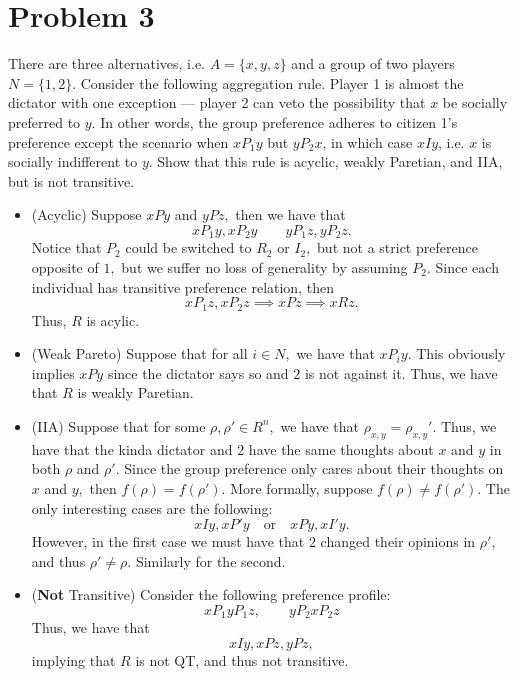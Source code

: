 \documentclass[11pt]{article}
\begin{document}
\newpage
\section*{Problem 3}
There are three alternatives, i.e. $A = \{x, y, z\}$ and a group of two players $N =\{1, 2\}.$ Consider the following aggregation rule. Player 1 is almost the dictator with one
exception — player 2 can veto the possibility that $x$ be socially preferred to $y$. In other
words, the group preference adheres to citizen 1’s preference except the scenario when $xP_1y$
but $yP_2x$, in which case $xIy$, i.e. $x$ is socially indifferent to $y$. Show that this rule is acyclic, weakly Paretian, and IIA, but is not transitive.
\begin{solution}
\begin{itemize}
    \item (Acyclic)
    Suppose $xPy$ and $yPz,$ then we have that 
    \[xP_1y, xP_2y \qquad yP_1z, yP_2z.\] Notice that $P_2$ could be switched to $R_2$ or $I_2,$ but not a strict preference opposite of $1,$ but we suffer no loss of generality by assuming $P_2.$
    Since each individual has transitive preference relation, then 
    \[xP_1z, xP_2z \implies xPz\implies xRz.\] Thus, $R$ is acylic.\\
    \item (Weak Pareto) Suppose that for all $i\in N,$ we have that $xP_iy.$ This obviously implies $xPy$ since the dictator says so and $2$ is not against it. Thus, we have that $R$ is weakly Paretian.\\
    \item (IIA) Suppose that for some $\rho, \rho' \in R^n,$ we have that $\rho_{x,y} = \rho_{x,y}'.$ Thus, we have that the kinda dictator and $2$ have the same thoughts about $x$ and $y$ in both $\rho$ and $\rho'.$ Since the group preference only cares about their thoughts on $x$ and $y,$ then $f(\rho) = f(\rho').$ More formally, suppose $f(\rho)\neq f(\rho').$ The only interesting cases are the following:
    \[xIy, xP'y \quad \text{or} \quad xPy, xI'y.\]
    However, in the first case we must have that $2$ changed their opinions in $\rho',$ and thus $\rho' \neq \rho.$ Similarly for the second.
    \item (\textbf{Not} Transitive) Consider the following preference profile:
    \[xP_1yP_1z, \qquad yP_2xP_2z\] Thus, we have that 
    \[xIy, xPz, yPz,\] implying that $R$ is not QT, and thus not transitive. 
\end{itemize}
\end{solution}
\end{document}
